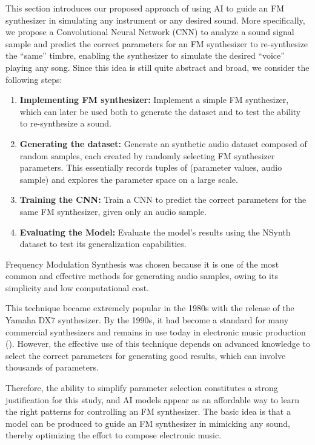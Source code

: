 \documentclass[sigconf,natbib=false]{acmart}
\begin{document}
This section introduces our proposed approach of using AI to guide an FM synthesizer in simulating any instrument or any desired sound. More specifically, we propose a Convolutional Neural Network (CNN) to analyze a sound signal sample and predict the correct parameters for an FM synthesizer to re-synthesize the ``same'' timbre, enabling the synthesizer to simulate the desired ``voice'' playing any song. Since this idea is still quite abstract and broad, we consider the following steps:

\begin{enumerate}
    \item \textbf{Implementing FM synthesizer:} Implement a simple FM synthesizer, which can later be used both to generate the dataset and to test the ability to re-synthesize a sound.
    \item \textbf{Generating the dataset:} Generate an synthetic audio dataset composed of random samples, each created by randomly selecting FM synthesizer parameters. This essentially records tuples of (parameter values, audio sample) and explores the parameter space on a large scale.
    \item \textbf{Training the CNN:} Train a CNN to predict the correct parameters for the same FM synthesizer, given only an audio sample.
    \item \textbf{Evaluating the Model:} Evaluate the model's results using the NSynth dataset to test its generalization capabilities.
\end{enumerate}

Frequency Modulation Synthesis was chosen because it is one of the most common and effective methods for generating audio samples, owing to its simplicity and low computational cost.

This technique became extremely popular in the 1980s with the release of the Yamaha DX7 synthesizer. By the 1990s, it had become a standard for many commercial synthesizers and remains in use today in electronic music production (\textcite{claesson2021resynthesis}). However, the effective use of this technique depends on advanced knowledge to select the correct parameters for generating good results, which can involve thousands of parameters.

Therefore, the ability to simplify parameter selection constitutes a strong justification for this study, and AI models appear as an affordable way to learn the right patterns for controlling an FM synthesizer. The basic idea is that a model can be produced to guide an FM synthesizer in mimicking any sound, thereby optimizing the effort to compose electronic music.
\end{document}
